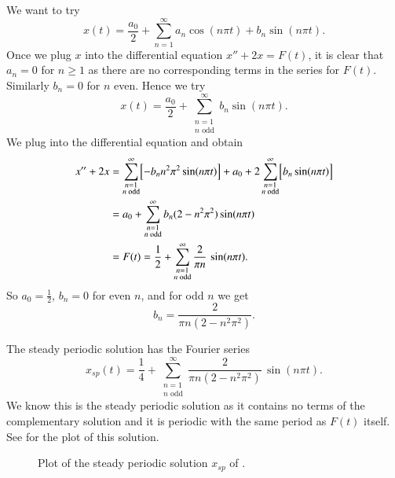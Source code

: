 \documentclass[12pt]{book}
\begin{document}
\begin{example}
We want to try
\begin{equation*}
x(t) = \frac{a_0}{2} + \sum_{n=1}^\infty
a_n \cos (n \pi t) +
b_n \sin (n \pi t) .
\end{equation*}
Once we plug $x$ into the differential equation $x''+2x = F(t)$,
it is clear that $a_n = 0$ for $n \geq 1$ as there are no corresponding terms
in the series for
$F(t)$.  Similarly $b_n = 0$ for $n$ even.  Hence we try
\begin{equation*}
x(t) = \frac{a_0}{2} +
\sum_{\substack{n=1 \\ n \text{ odd}}}^\infty
b_n \sin (n \pi t) .
\end{equation*}
We plug into the differential equation and obtain
\begin{equation*}
\begin{split}
x'' + 2 x & =
\sum_{\substack{n=1 \\ n \text{ odd}}}^\infty
\Bigl[ - b_n n^2 \pi^2 \sin (n \pi t) \Bigr] + 
a_0 +
2
\sum_{\substack{n=1 \\ n \text{ odd}}}^\infty
\Bigl[ b_n \sin (n \pi t) \Bigr]
\\
& =
a_0 +
\sum_{\substack{n=1 \\ n \text{ odd}}}^\infty
b_n (2 - n^2 \pi^2 ) \sin (n \pi t)
\\
& =
F(t) = \frac{1}{2} + \sum_{\substack{n=1 \\ n \text{ odd}}}^\infty
\frac{2}{\pi n} \, \sin (n \pi t) .
\end{split}
\end{equation*}
So $a_0 = \frac{1}{2}$, $b_n = 0$ for even $n$, and for odd $n$ we
get
\begin{equation*}
b_n = 
\frac{2}{\pi n (2 - n^2 \pi^2 )} .
\end{equation*}

The steady periodic solution has the Fourier series
\begin{equation*}
x_{sp}(t) = \frac{1}{4} + \sum_{\substack{n=1 \\ n \text{ odd}}}^\infty
\frac{2}{\pi n (2 - n^2 \pi^2 )} \,
\sin (n \pi t) .
\end{equation*}
We know this is the steady periodic solution as it contains no terms 
of the complementary solution and it is periodic with the same period as
$F(t)$ itself.  See  for the plot of this solution.
\begin{figure}[h!t]
\capstart
\begin{center}
\caption{Plot of the steady periodic solution $x_{sp}$ of
.%
\label{afs:steadyexfig}}
\end{center}
\end{figure}
\end{example}
\end{document}
